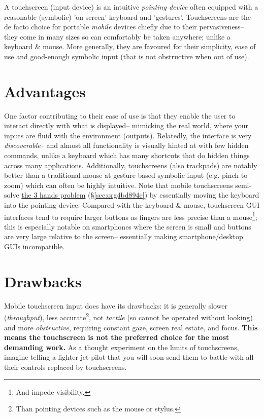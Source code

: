 \documentclass[logo,bsc,singlespacing,parskip]{infthesis}
\begin{document}
A touchscreen (input device) is an intuitive  \emph{pointing device} often equipped with a reasonable (symbolic) 'on-screen' keyboard and 'gestures'.
Touchscreens are the de facto choice for portable \emph{mobile} devices chiefly due to their pervasiveness-- they come in many sizes so can comfortably be taken anywhere; unlike a keyboard \& mouse.
More generally, they are favoured for their simplicity, ease of use and good-enough symbolic input (that is not obstructive when out of use).
\section{Advantages}
\label{sec:org4552562}
One factor contributing to their ease of use is that they enable the user to interact directly with what is displayed-- mimicking the real world, where your inputs are fluid with the environment (outputs).
Relatedly, the interface is very \emph{discoverable}-- and almost all functionality is visually hinted at with few hidden commands, unlike a keyboard which has many shortcuts that do hidden things across many applications.
Additionally, touchscreens (also trackpads) are notably better than a traditional mouse at gesture based symbolic input (e.g. pinch to zoom) which can often be highly intuitive.
Note that mobile touchscreens semi-solve \hyperref[sec:org4bd894e]{the 3 hands problem} (\S \ref{sec:org4bd894e}) by essentially moving the keyboard into the pointing device.
Compared with the keyboard \& mouse, touchscreen GUI interfaces tend to require larger buttons as fingers are less precise than a mouse\footnote{And impede visibility.}; this is especially notable on smartphones where the screen is small and buttons are very large relative to the screen-- essentially making smartphone/desktop GUIs incompatible.

\section{Drawbacks}
\label{sec:orgf3c2e36}
Mobile touchscreen input does have its drawbacks: it is generally slower (\emph{throughput}), less accurate\footnote{Than pointing devices such as the mouse or stylus.}, not \emph{tactile} (so cannot be operated without looking) and more \emph{obstructive}, requiring constant gaze, screen real estate, and focus.
\textbf{This means the touchscreen is not the preferred choice for the most demanding work.}
As a thought experiment on the limits of  touchscreens, imagine telling a fighter jet pilot that you will soon send them to battle with all their controls replaced by touchscreens.
\end{document}
